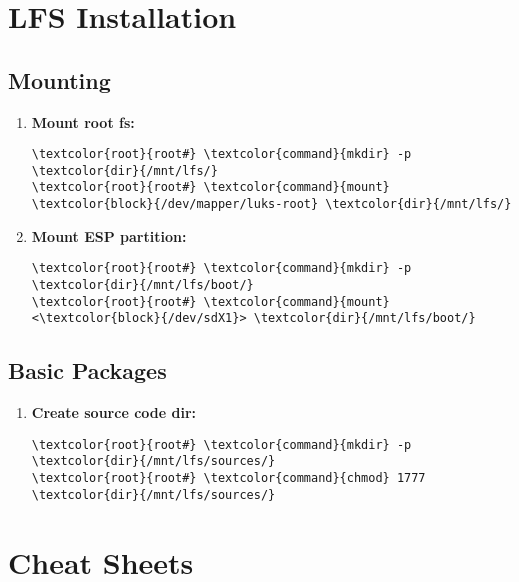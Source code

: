 \documentclass[10pt, a4paper, onecolumn, oneside, titlepage, openany]{book}
\begin{document}
\chapter{LFS Installation}
\section{Mounting}
\begin{enumerate}
    \item \textbf{Mount root fs:}
\begin{Verbatim}[commandchars=\\\{\}]
\textcolor{root}{root#} \textcolor{command}{mkdir} -p \textcolor{dir}{/mnt/lfs/}
\textcolor{root}{root#} \textcolor{command}{mount} \textcolor{block}{/dev/mapper/luks-root} \textcolor{dir}{/mnt/lfs/}
\end{Verbatim}
    \item \textbf{Mount ESP partition:}
\begin{Verbatim}[commandchars=\\\{\}]
\textcolor{root}{root#} \textcolor{command}{mkdir} -p \textcolor{dir}{/mnt/lfs/boot/}
\textcolor{root}{root#} \textcolor{command}{mount} <\textcolor{block}{/dev/sdX1}> \textcolor{dir}{/mnt/lfs/boot/}
\end{Verbatim}
\end{enumerate}

\section{Basic Packages}
\begin{enumerate}
    \item \textbf{Create source code dir:}
\begin{Verbatim}[commandchars=\\\{\}]
\textcolor{root}{root#} \textcolor{command}{mkdir} -p \textcolor{dir}{/mnt/lfs/sources/}
\textcolor{root}{root#} \textcolor{command}{chmod} 1777 \textcolor{dir}{/mnt/lfs/sources/}
\end{Verbatim}
\end{enumerate}


\chapter{Cheat Sheets}
\end{document}

